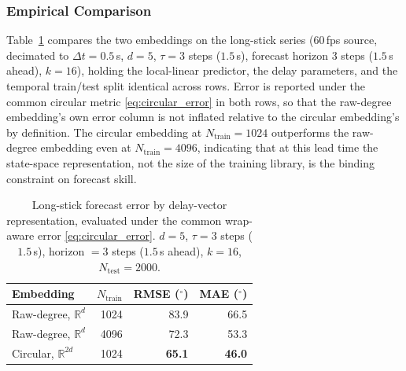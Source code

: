 \documentclass[letterpaper, 10pt, conference]{IEEEtran}
\begin{document}
    \subsubsection{Empirical Comparison}
    \label{sssec:circ_results}

        Table~\ref{tab:circular_comparison} compares the two embeddings on
        the long-stick series (60\,fps source, decimated to $\Delta t=0.5$\,s,
        $d=5$, $\tau=3$ steps ($1.5$\,s), forecast horizon $3$ steps ($1.5$\,s
        ahead), $k=16$), holding the local-linear predictor, the delay
        parameters, and the temporal train/test split identical across rows.
        Error is reported under the common circular metric
        \eqref{eq:circular_error} in both rows, so that the raw-degree
        embedding's own error column is not inflated relative to the
        circular embedding's by definition. The circular embedding at
        $N_{\mathrm{train}}=1024$ outperforms the raw-degree embedding even
        at $N_{\mathrm{train}}=4096$, indicating that at this lead time the
        state-space representation, not the size of the training library, is
        the binding constraint on forecast skill.

        \begin{table}[htbp]
        \begin{center}
        \caption{Long-stick forecast error by delay-vector representation, evaluated under the common wrap-aware error \eqref{eq:circular_error}. $d=5$, $\tau=3$ steps ($1.5$\,s), horizon $=3$ steps ($1.5$\,s ahead), $k=16$, $N_{\mathrm{test}}=2000$.}
        \label{tab:circular_comparison}
        \begin{tabular}{|l|r|r|r|}
        \hline
        \textbf{Embedding} & \textbf{$N_{\mathrm{train}}$} & \textbf{RMSE ($^\circ$)} & \textbf{MAE ($^\circ$)} \\ \hline
        Raw-degree, $\mathbb{R}^{d}$    & 1024 & 83.9 & 66.5 \\ \hline
        Raw-degree, $\mathbb{R}^{d}$    & 4096 & 72.3 & 53.3 \\ \hline
        Circular, $\mathbb{R}^{2d}$     & 1024 & \textbf{65.1} & \textbf{46.0} \\ \hline
        \end{tabular}
        \end{center}
        \end{table}
\end{document}
